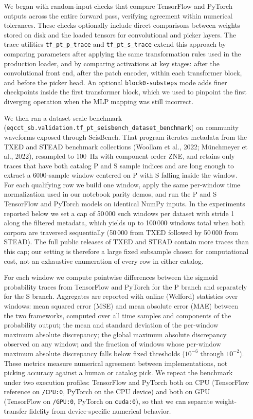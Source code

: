 We began with random-input checks that compare TensorFlow and PyTorch outputs across the entire forward pass, verifying agreement within numerical tolerances. These checks optionally include direct comparisons between weights stored on disk and the loaded tensors for convolutional and picker layers. The trace utilities \texttt{tf\_pt\_p\_trace} and \texttt{tf\_pt\_s\_trace} extend this approach by comparing parameters after applying the same transformation rules used in the production loader, and by comparing activations at key stages: after the convolutional front end, after the patch encoder, within each transformer block, and before the picker head. An optional \texttt{block0-substeps} mode adds finer checkpoints inside the first transformer block, which we used to pinpoint the first diverging operation when the MLP mapping was still incorrect.

We then ran a dataset-scale benchmark (\texttt{eqcct\_sb.validation.tf\_pt\_seisbench\_dataset\_benchmark}) on community waveforms exposed through SeisBench. That program iterates metadata from the TXED and STEAD benchmark collections (Woollam et al., 2022; Münchmeyer et al., 2022), resampled to 100~Hz with component order ZNE, and retains only traces that have both catalog P and S sample indices and are long enough to extract a 6000-sample window centered on P with S falling inside the window. For each qualifying row we build one window, apply the same per-window time normalization used in our notebook parity demos, and run the P and S TensorFlow and PyTorch models on identical NumPy inputs. In the experiments reported below we set a cap of 50\,000 such windows per dataset with stride 1 along the filtered metadata, which yields up to 100\,000 windows total when both corpora are traversed sequentially (50\,000 from TXED followed by 50\,000 from STEAD). The full public releases of TXED and STEAD contain more traces than this cap; our setting is therefore a large fixed subsample chosen for computational cost, not an exhaustive enumeration of every row in either catalog.

For each window we compute pointwise differences between the sigmoid probability traces from TensorFlow and PyTorch for the P branch and separately for the S branch. Aggregates are reported with online (Welford) statistics over windows: mean squared error (MSE) and mean absolute error (MAE) between the two frameworks, computed over all time samples and components of the probability output; the mean and standard deviation of the per-window maximum absolute discrepancy; the global maximum absolute discrepancy observed on any window; and the fraction of windows whose per-window maximum absolute discrepancy falls below fixed thresholds ($10^{-6}$ through $10^{-2}$). These metrics measure numerical agreement between implementations, not picking accuracy against a human or catalog pick. We repeat the benchmark under two execution profiles: TensorFlow and PyTorch both on CPU (TensorFlow reference on \texttt{/CPU:0}, PyTorch on the CPU device) and both on GPU (TensorFlow on \texttt{/GPU:0}, PyTorch on \texttt{cuda:0}), so that we can separate weight-transfer fidelity from device-specific numerical behavior.

